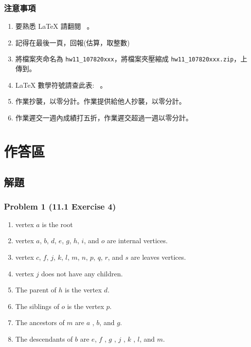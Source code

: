 \documentclass[12pt,hyperref={bookmarks=false}]{beamer}
\begin{document}
	\begin{frame}
	\frametitle{注意事項}
	\fontsize{10}{10pt}\selectfont
	\begin{enumerate}[label=(\alph*)]
	\item 要熟悉 LaTeX 請翻閱 \ 。
	\item 記得在最後一頁，回報\selectfont \color{red}{完成作業小時數}(估算，取整數)\selectfont \color{black}{。}
	\item 將檔案夾命名為 \texttt{hw11\_107820xxx}，將檔案夾壓縮成 \texttt{hw11\_107820xxx.zip}，上傳到。
	\item LaTeX 數學符號請查此表: \ 。
	\item 作業抄襲，以零分計。作業提供給他人抄襲，以零分計。
	\item 作業遲交一週內成績打五折，作業遲交超過一週以零分計。
	\end{enumerate}
	\end{frame}

\section{作答區}

	\subsection{解題}

	\begin{frame}
	\frametitle{Problem 1 (11.1 Exercise 4)}
	\fontsize{12}{16pt}\selectfont
	\begin{enumerate}[label=(\alph*)]
	\setlength\itemsep{0em}
	\item vertex $a$ is the root
	\item vertex $a$, $b$, $d$, $e$, $g$, $h$, $i$, and $o$ are internal vertices.
	\item vertex $c$, $f$, $j$, $k$, $l$, $m$, $n$, $p$, $q$, $r$, and $s$ are leaves vertices.
	\item vertex $j$ does not have any children.
	\item The parent of $h$ is the vertex $d$.
	\item The siblings of $o$ is the vertex $p$.
	\item The ancestors of $m$ are $a$ , $b$, and $g$.
	\item The descendants of $b$ are $e$, $f$ , $g$ , $j$ , $k$ , $l$, and $m$.
	\end{enumerate}
	\end{frame}
\end{document}
